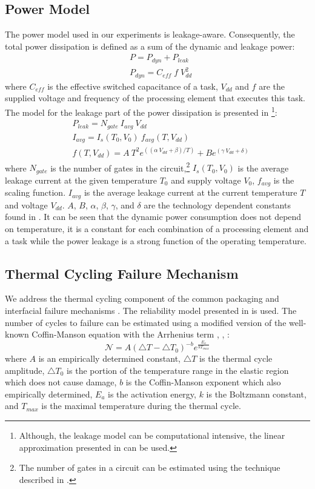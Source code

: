 \subsection{Power Model}
The power model used in our experiments is leakage-aware. Consequently, the total power dissipation is defined as a sum of the dynamic and leakage power:
\begin{align*}
  & P = P_{dyn} + P_{leak} \\
  & P_{dyn} = C_{eff} \; f \; V_{dd}^2
\end{align*}
where $C_{eff}$ is the effective switched capacitance of a task, $V_{dd}$ and $f$ are the supplied voltage and frequency of the processing element that executes this task. The model for the leakage part of the power dissipation is presented in \cite{liao2005}\footnote{Although, the leakage model can be computational intensive, the linear approximation presented in \cite{liu2007} can be used.}:
\begin{align*}
  & P_{leak} = N_{gate} \: I_{avg} \: V_{dd} \\
  & I_{avg} = I_s(T_0, V_0) \: f_{avg}(T, V_{dd}) \\
  & f(T, V_{dd}) = A \: T^2 e^{((\alpha \: V_{dd} + \beta)/T)} + B e^{(\gamma \: V_{dd} + \delta)}
\end{align*}
where $N_{gate}$ is the number of gates in the circuit,\footnote{The number of gates in a circuit can be estimated using the technique described in \cite{li2004}.} $I_s (T_0, V_0)$ is the average leakage current at the given temperature $T_0$ and supply voltage $V_0$, $f_{avg}$ is the scaling function. $I_{avg}$ is the average leakage current at the current temperature $T$ and voltage $V_{dd}$. $A$, $B$, $\alpha$, $\beta$, $\gamma$, and $\delta$ are the technology dependent constants found in \cite{liao2005}. It can be seen that the dynamic power consumption does not depend on temperature, it is a constant for each combination of a processing element and a task while the power leakage is a strong function of the operating temperature.

\subsection{Thermal Cycling Failure Mechanism}
We address the thermal cycling component of the common packaging and interfacial failure mechanisms \cite{jedec2010}. The reliability model presented in \cite{xiang2010} is used. The number of cycles to failure can be estimated using a modified version of the well-known Coffin-Manson equation with the Arrhenius term \cite{jedec2010}, \cite{xiang2010}, \cite{ciappa2003}:
\begin{equation} \label{eq:cycles-to-failure}
  \mathcal{N} = A (\triangle T - \triangle T_0)^{-b} e^{\frac{E_a}{k T_{max}}}
\end{equation}
where $A$ is an empirically determined constant, $\triangle T$ is the thermal cycle amplitude, $\triangle T_0$ is the portion of the temperature range in the elastic region which does not cause damage, $b$ is the Coffin-Manson exponent which also empirically determined, $E_{a}$ is the activation energy, $k$ is the Boltzmann constant, and $T_{max}$ is the maximal temperature during the thermal cycle.

